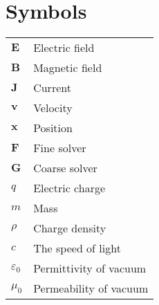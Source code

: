 \documentclass[master=wit, english]{kulemt}
\begin{document}
\section*{Symbols}
\begin{flushleft}
  \renewcommand{\arraystretch}{1.1}
  \begin{tabularx}{\textwidth}{@{}p{12mm}X@{}}
    $\textbf{E}$    & Electric field \\
    $\textbf{B}$   & Magnetic field \\
    $\textbf{J}$ & Current\\
    $\textbf{v}$   & Velocity \\
    $\textbf{x}$   & Position \\
    $\textbf{F}$ & Fine solver \\
    $\textbf{G}$ & Coarse solver \\
    $q$ & Electric charge\\
    $m$ & Mass\\
    $\rho$ & Charge density\\
    $c$ & The speed of light\\
    $\varepsilon_0$ & Permittivity of vacuum\\
    $\mu_0$ & Permeability of vacuum\\
    
  \end{tabularx}
\end{flushleft}

\mainmatter







\appendixpage*          %
\appendix



\backmatter


\end{document}
